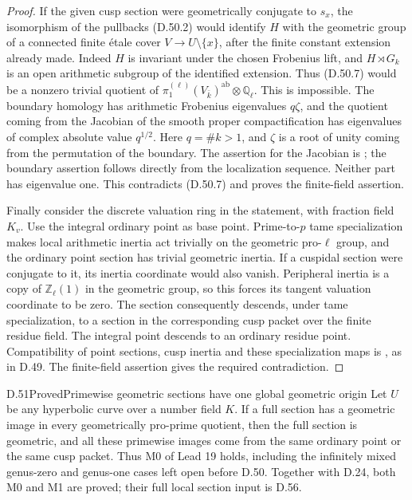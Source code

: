 \begin{proof}
If the given cusp section were geometrically
conjugate to \(s_x\), the isomorphism of the
pullbacks (D.50.2) would identify \(H\) with
the geometric group of a connected finite
étale cover \(V\to U\setminus\{x\}\), after
the finite constant extension already made.
Indeed \(H\) is invariant under the chosen
Frobenius lift, and \(H\rtimes G_k\) is an
open arithmetic subgroup of the identified
extension. Thus (D.50.7) would be a nonzero
trivial quotient of
\(\pi_1^{(\ell)}(V_{\bar k})^{\mathrm{ab}}
\otimes\mathbb Q_\ell\).
This is impossible. The boundary homology
has arithmetic Frobenius eigenvalues \(q\zeta\),
and the quotient coming from the Jacobian of
the smooth proper compactification has eigenvalues
of complex absolute value \(q^{1/2}\).
Here \(q=\#k>1\), and \(\zeta\) is a root of
unity coming from the permutation of the boundary.
The assertion for the Jacobian is
\cite[Theorem 14.1(b) and (9.20)]{DE_MilneAV};
the boundary assertion follows directly from
the localization sequence.
Neither part has eigenvalue one.
This contradicts (D.50.7) and proves
the finite-field assertion.

Finally consider the discrete valuation ring in
the statement, with fraction field \(K_v\).
Use the integral ordinary point as base point.
Prime-to-\(p\) tame specialization makes local
arithmetic inertia act trivially on the
geometric pro-\(\ell\) group, and the ordinary
point section has trivial geometric inertia.
If a cuspidal section were conjugate to it,
its inertia coordinate would also vanish.
Peripheral inertia is a copy of
\(\mathbb Z_\ell(1)\) in the geometric group,
so this forces its tangent valuation coordinate
to be zero. The section consequently descends,
under tame specialization, to a section in
the corresponding cusp packet over the
finite residue field. The integral point
descends to an ordinary residue point.
Compatibility of point sections, cusp inertia
and these specialization maps is
\cite[Expos\'e XIII, Corollary 2.9 and
\S\S2.10--2.12]{DE_SGA1}, as in D.49.
The finite-field assertion gives the required
contradiction.
\end{proof}

\begin{statement}{D.51}{Proved}{Primewise geometric sections have one global geometric origin}
Let \(U\) be any hyperbolic
curve over a number field \(K\). If a full
section has a geometric image in every
geometrically pro-prime quotient, then
the full section is geometric, and all
these primewise images come from the same
ordinary point or the same cusp packet.
Thus M0 of Lead 19 holds, including the
infinitely mixed genus-zero and genus-one
cases left open before D.50. Together with
D.24, both M0 and M1 are proved; their full
local section input is D.56.
\end{statement}

